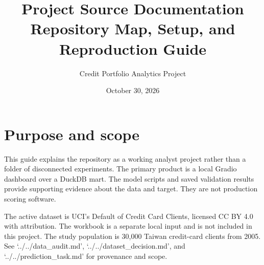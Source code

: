 \documentclass[11pt,letterpaper]{article}
\title{Project Source Documentation\\\large Repository Map, Setup, and Reproduction Guide}
\author{Credit Portfolio Analytics Project}
\date{October 30, 2026}
\begin{document}
\maketitle
\tableofcontents

\newpage

\section{Purpose and scope}
This guide explains the repository as a working analyst project rather than a folder of disconnected experiments. The primary product is a local Gradio dashboard over a DuckDB mart. The model scripts and saved validation results provide supporting evidence about the data and target. They are not production scoring software.

The active dataset is UCI's Default of Credit Card Clients, licensed CC BY 4.0 with attribution. The workbook is a separate local input and is not included in this project. The study population is 30,000 Taiwan credit-card clients from 2005. See `../../data\_audit.md', `../../dataset\_decision.md', and `../../prediction\_task.md' for provenance and scope.
\end{document}

